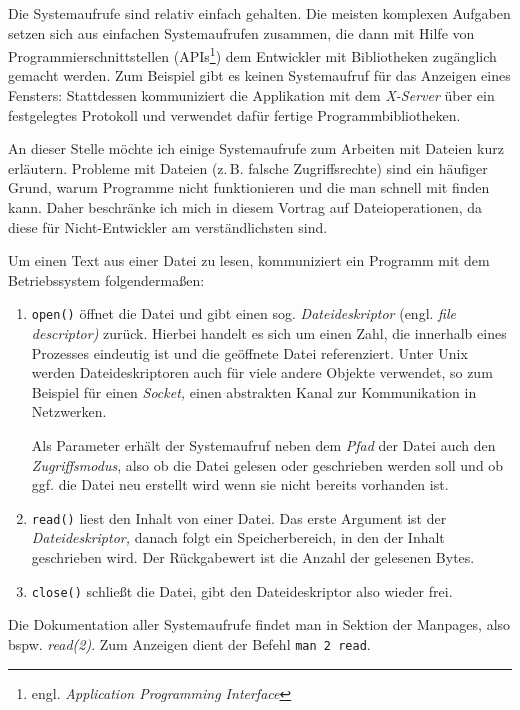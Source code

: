 \documentclass[10pt,DIV=15,twocolumn,ngerman,parskip=half]{scrartcl}
\begin{document}
Die Systemaufrufe sind relativ einfach gehalten. Die meisten komplexen Aufgaben setzen sich aus
einfachen Systemaufrufen zusammen, die dann mit Hilfe von Programmierschnittstellen (APIs\footnote{
engl. \emph{Application Programming Interface}}) dem Entwickler mit Bibliotheken zugänglich gemacht
werden. Zum Beispiel gibt es keinen Systemaufruf für das Anzeigen eines Fensters: Stattdessen
kommuniziert die Applikation mit dem \emph{X-Server} über ein festgelegtes Protokoll und verwendet
dafür fertige Programmbibliotheken.


An dieser Stelle möchte ich einige Systemaufrufe zum Arbeiten mit Dateien kurz erläutern. Probleme
mit Dateien (z.\,B. falsche Zugriffsrechte) sind ein häufiger Grund, warum Programme nicht
funktionieren und die man schnell mit \strace{} finden kann. Daher beschränke ich mich in diesem
Vortrag auf Dateioperationen, da diese für Nicht-Entwickler am verständlichsten sind.

Um einen Text aus einer Datei zu lesen, kommuniziert ein Programm mit dem Betriebssystem
folgendermaßen:

\begin{enumerate}
  \item \texttt{open()} öffnet die Datei und gibt einen sog. \emph{Dateideskriptor} (engl.
   \emph{file descriptor)} zurück. Hierbei handelt es sich um einen Zahl, die innerhalb eines 
   Prozesses eindeutig ist und die geöffnete Datei referenziert. Unter Unix werden 
   Dateideskriptoren auch für viele andere Objekte verwendet, so zum Beispiel für einen
   \emph{Socket,} einen abstrakten Kanal zur Kommunikation in Netzwerken.

   Als Parameter erhält der Systemaufruf neben dem \emph{Pfad} der Datei auch den 
   \emph{Zugriffsmodus}, also ob die Datei gelesen oder geschrieben werden soll und ob ggf. die 
   Datei neu erstellt wird wenn sie nicht bereits vorhanden ist.

  \item \texttt{read()} liest den Inhalt von einer Datei. Das erste Argument ist der
   \emph{Dateideskriptor,} danach folgt ein Speicherbereich, in den der Inhalt geschrieben wird.
   Der Rückgabewert ist die Anzahl der gelesenen Bytes.

  \item \texttt{close()} schließt die Datei, gibt den Dateideskriptor also wieder frei.
\end{enumerate}

Die Dokumentation aller Systemaufrufe findet man in Sektion der Manpages, also bspw.
\emph{read(2)}. Zum Anzeigen dient der Befehl \texttt{man 2 read}.

    
\end{document}
